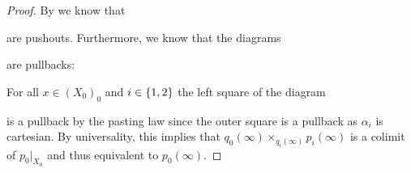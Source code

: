\begin{lemma}
\begin{proof}
        By %
        we know that
        \begin{center}
        \end{center}
        are pushouts.
        Furthermore, we know that the diagrams 
        \begin{center}
        \end{center}
        are pullbacks: 

        For all $x\in \left(X_0\right)_0$ and $i\in\left\lbrace1,2\right\rbrace$ the left square of the diagram 
        \begin{center}
        \end{center}
        is a pullback by the pasting law since the outer square is a pullback as $\alpha_i$ is cartesian.
        By universality, this implies that $q_0(\infty)\times_{q_i(\infty)}p_i(\infty)$ is a colimit of $p_0|_{X_0}$ and thus equivalent to $p_0(\infty)$.


\end{proof}
\end{lemma}
